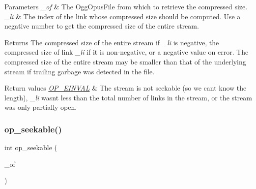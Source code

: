 \begin{DoxyParams}{Parameters}
{\em \+\_\+of} & The {\ttfamily Ogg\+Opus\+File} from which to retrieve the compressed size. \\
\hline
{\em \+\_\+li} & The index of the link whose compressed size should be computed. Use a negative number to get the compressed size of the entire stream. \\
\hline
\end{DoxyParams}
\begin{DoxyReturn}{Returns}
The compressed size of the entire stream if {\itshape \+\_\+li} is negative, the compressed size of link {\itshape \+\_\+li} if it is non-\/negative, or a negative value on error. The compressed size of the entire stream may be smaller than that of the underlying stream if trailing garbage was detected in the file. 
\end{DoxyReturn}

\begin{DoxyRetVals}{Return values}
{\em \mbox{\hyperlink{group__error__codes_gae0879acafe9cc0ab72462d291fdb6fb6}{O\+P\+\_\+\+E\+I\+N\+V\+AL}}} & The stream is not seekable (so we can\textquotesingle{}t know the length), {\itshape \+\_\+li} wasn\textquotesingle{}t less than the total number of links in the stream, or the stream was only partially open. \\
\hline
\end{DoxyRetVals}
\mbox{\label{group__stream__info_ga9272a4a6ac9e01fbc549008f5ff58b4c}} 
\subsubsection{\texorpdfstring{op\_seekable()}{op\_seekable()}}
{\footnotesize\ttfamily int op\+\_\+seekable (\begin{DoxyParamCaption}\item[{const Ogg\+Opus\+File $\ast$}]{\+\_\+of }\end{DoxyParamCaption})}

